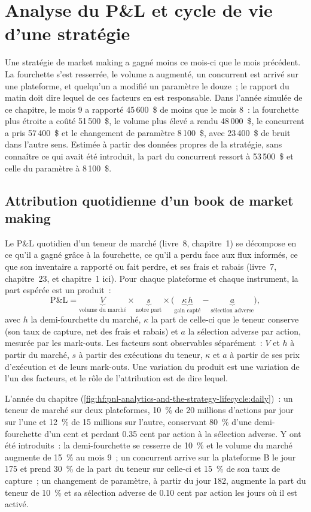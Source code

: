 \chapter{Analyse du P\&L et cycle de vie d'une stratégie}\label{ch:hf:pnl-analytics-and-the-strategy-lifecycle}

Une stratégie de market making a gagné moins ce mois-ci que le mois précédent. La fourchette s'est resserrée, le volume a augmenté, un concurrent est arrivé sur une plateforme, et
quelqu'un a modifié un paramètre le douze~; le rapport du matin doit dire lequel de ces facteurs en est responsable. Dans l'année simulée de ce chapitre, le mois 9 a rapporté
45\,600~\$ de moins que le mois 8~: la fourchette plus étroite a coûté 51\,500~\$, le volume plus élevé a rendu 48\,000~\$, le concurrent a pris 57\,400~\$ et le changement de paramètre
8\,100~\$, avec 23\,400~\$ de bruit dans l'autre sens. Estimée à partir des données propres de la stratégie, sans connaître ce qui avait été introduit, la part du concurrent
ressort à 53\,500~\$ et celle du paramètre à 8\,100~\$.

\section{Attribution quotidienne d'un book de market making}

Le P\&L quotidien d'un teneur de marché (livre~8, chapitre~1) se décompose en ce qu'il a gagné grâce à la fourchette, ce qu'il a perdu face aux flux informés, ce que son
inventaire a rapporté ou fait perdre, et ses frais et rabais (livre~7, chapitre~23, et chapitre~1 ici). Pour chaque plateforme et chaque instrument, la part espérée
est un produit~:
\[
\text{P\&L}=\underbrace{V}_{\text{volume du marché}}\times\underbrace{s}_{\text{notre part}}\times\bigl(\underbrace{\kappa\,h}_{\text{gain capté}}
-\underbrace{a}_{\text{sélection adverse}}\bigr),
\]
avec $h$ la demi-fourchette du marché, $\kappa$ la part de celle-ci que le teneur conserve (son taux de capture, net des frais et rabais) et $a$ la sélection adverse
par action, mesurée par les mark-outs. Les facteurs sont observables séparément~: $V$ et $h$ à partir du marché, $s$ à partir des exécutions du teneur, $\kappa$ et $a$ à partir
de ses prix d'exécution et de leurs mark-outs. Une variation du produit est une variation de l'un des facteurs, et le rôle de l'attribution est de dire lequel.

L'année du chapitre (\cref{fig:hf:pnl-analytics-and-the-strategy-lifecycle:daily})~: un teneur de marché sur deux plateformes, 10~\% de 20 millions d'actions par jour sur l'une et
12~\% de 15 millions sur l'autre, conservant 80~\% d'une demi-fourchette d'un cent et perdant 0.35 cent par action à la sélection adverse. Y ont été introduits~: la demi-fourchette
se resserre de 10~\% et le volume du marché augmente de 15~\% au mois 9~; un concurrent arrive sur la plateforme B le jour 175 et prend 30~\% de la part du teneur sur celle-ci et 15~\%
de son taux de capture~; un changement de paramètre, à partir du jour 182, augmente la part du teneur de 10~\% et sa sélection adverse de 0.10 cent par action les jours
où il est activé.

